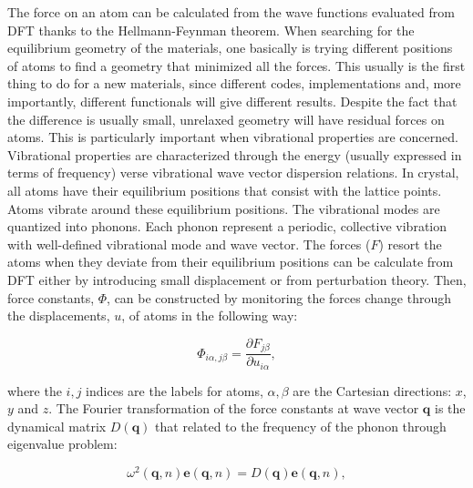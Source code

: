 The force on an atom can be calculated from the wave functions evaluated from DFT thanks to the Hellmann-Feynman theorem. When searching for the equilibrium geometry of the materials, one basically is trying different positions of atoms to find a geometry that minimized all the forces. This usually is the first thing to do for a new materials, since different codes, implementations and, more importantly, different functionals will give different results. Despite the fact that the difference is usually small, unrelaxed geometry will have residual forces on atoms. This is particularly important when vibrational properties are concerned. Vibrational properties are characterized through the energy (usually expressed in terms of frequency) verse vibrational wave vector dispersion relations.  In crystal,  all atoms have their equilibrium positions that consist with the lattice points. Atoms vibrate around these equilibrium positions. The vibrational modes are quantized into phonons. Each phonon represent a periodic, collective vibration with well-defined vibrational mode and wave vector. The forces ($F$) resort the atoms when they deviate from their equilibrium positions can be calculate from DFT either by introducing small displacement or from perturbation theory. Then, force constants, $\Phi$, can be constructed by monitoring the forces change through the displacements, $u$, of atoms in the following way:

\begin{equation}
\Phi_{i\alpha,j\beta}= \frac{\partial F_{j\beta}}{\partial u_{i\alpha}},
\end{equation} 

where the $i,j$ indices are the labels for atoms, $\alpha,\beta$ are the Cartesian directions: $x$, $y$ and $z$. The Fourier transformation of the force constants at wave vector $\mathbf{q}$ is the dynamical matrix $D(\mathbf{q})$ that related to the frequency of the phonon through eigenvalue problem:

\begin{equation}\label{eqa:w_q}
\omega^2(\mathbf{q},n)\mathbf{e}(\mathbf{q},n)=D(\mathbf{q})\mathbf{e}(\mathbf{q},n),
\end{equation}

